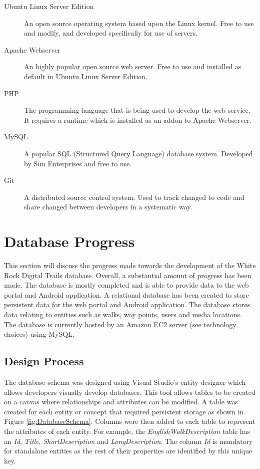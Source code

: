 \documentclass[11pt,a4paper]{article}
\begin{document}
\begin{description}
\item[Ubuntu Linux Server Edition] An open source operating system based upon the Linux kernel. Free to use and modify, and developed specifically for use of servers.

\item[Apache Webserver] An highly popular open source web server. Free to use and installed as default in Ubuntu Linux Server Edition.

\item[PHP] The programming language that is being used to develop the web service. It requires a runtime which is installed as an addon to Apache Webserver.

\item[MySQL] A popular SQL (Structured Query Language) database system. Developed by Sun Enterprises and free to use.

\item[Git] A distributed source control system. Used to track changed to code and share changed between developers in a systematic way.
\end{description}


\section{Database Progress}

This section will discuss the progress made towards the development of the White Rock Digital Trails database.
Overall, a substantial amount of progress has been made.
The database is mostly completed and is able to provide data to the web portal and Android application.
A relational database has been created to store persistent data for the web portal and Android application.
The database stores data relating to entities such as walks, way points, users and media locations.
The database is currently hosted by an Amazon EC2 server (see technology choices) using MySQL.

\subsection{Design Process}

The database schema was designed using Visual Studio's entity designer which allows developers visually develop databases.
This tool allows tables to be created on a canvas where relationships and attributes can be modified.
A table was created for each entity or concept that required persistent storage as shown in Figure \ref{fig:DatabaseSchema}.
Columns were then added to each table to represent the attributes of each entity.
For example, the \emph{EnglishWalkDescription} table has an \emph{Id}, \emph{Title}, \emph{ShortDescription} and \emph{LongDescription}. The column \emph{Id} is mandatory for standalone entities as the rest of their properties are identified by this unique key.
\end{document}
